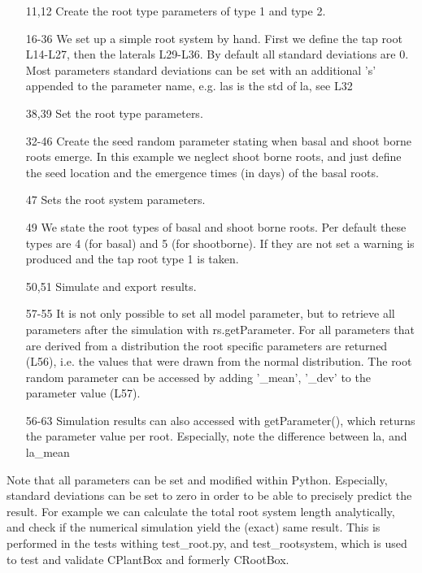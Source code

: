 \begin{itemize}

\item[11,12] Create the root type parameters of type 1 and type 2.
\item[16-36] We set up a simple root system by hand. First we define the tap root L14-L27, then the laterals L29-L36. By default all standard deviations are 0. Most parameters standard deviations can be set with an additional 's' appended to the parameter name, e.g. las is the std of la, see L32
\item[38,39] Set the root type parameters.

\item[32-46] Create the seed random parameter stating when basal and shoot borne roots emerge. In this example we neglect shoot borne roots, and just define the seed location and  the emergence times (in days) of the basal roots.
\item[47] Sets the root system parameters.

\item[49] We state the root types of basal and shoot borne roots. 
Per default these types are 4 (for basal) and 5 (for shootborne). 
If they are not set a warning is produced and the tap root type 1 is taken. 
\item[50,51] Simulate and export results. 

\item[57-55] It is not only possible to set all model parameter, 
but to retrieve all parameters after the simulation with rs.getParameter. 
For all parameters that are derived from a distribution the root specific parameters are returned (L56), 
i.e. the values that were drawn from the normal distribution. 
The root random parameter can be accessed by adding '\_mean', '\_dev' to the parameter value (L57).  

\item[56-63] Simulation results can also accessed with getParameter(), 
which returns the parameter value per root. Especially, note the difference between la, and la\_mean

\end{itemize}

Note that all parameters can be set and modified within Python. 
Especially, standard deviations can be set to zero in order to be able to precisely predict the result. 
For example we can calculate the total root system length analytically, 
and check if the numerical simulation yield the (exact) same result. 
This is performed in the tests withing test\_root.py, and test\_rootsystem, 
which is used to test and validate CPlantBox and formerly CRootBox.



